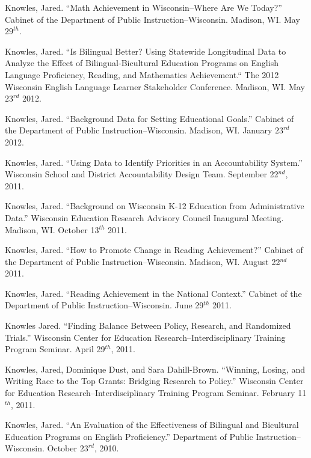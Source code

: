 \documentclass[margin,line]{res}
\begin{document}
\begin{resume}

Knowles, Jared. ``Math Achievement in Wisconsin--Where Are We Today?'' Cabinet of the Department of Public Instruction--Wisconsin. Madison, WI. May $29^{th}$. 

Knowles, Jared. ``Is Bilingual Better? Using Statewide Longitudinal Data to Analyze the Effect of Bilingual-Bicultural Education Programs on English Language Proficiency, Reading, and Mathematics Achievement.`` The 2012 Wisconsin English Language Learner Stakeholder Conference. Madison, WI. May $23^{rd}$ 2012. 

Knowles, Jared. ``Background Data for Setting Educational Goals.'' Cabinet of the Department of Public Instruction--Wisconsin. Madison, WI. January $23^{rd}$ 2012. 

Knowles, Jared. ``Using Data to Identify Priorities in an Accountability System.'' Wisconsin School and District Accountability Design Team. September 22$^{nd}$, 2011.

Knowles, Jared. ``Background on Wisconsin K-12 Education from Administrative Data.'' Wisconsin Education Research Advisory Council Inaugural Meeting. Madison, WI. October 13$^{th}$ 2011.

Knowles, Jared. ``How to Promote Change in Reading Achievement?'' Cabinet of the Department of Public Instruction--Wisconsin. Madison, WI. August 22$^{nd}$ 2011.

Knowles, Jared. ``Reading Achievement in the National Context.'' Cabinet of the Department of Public Instruction--Wisconsin. June 29$^{th}$ 2011.

Knowles Jared. ``Finding Balance Between Policy, Research, and Randomized Trials.'' Wisconsin Center for Education Research--Interdisciplinary Training Program Seminar. April 29$^{th}$, 2011.

Knowles, Jared, Dominique Dust, and Sara Dahill-Brown. ``Winning, Losing, and Writing Race to the Top Grants: Bridging Research to Policy.'' Wisconsin Center for Education Research--Interdisciplinary Training Program Seminar. February 11$^{th}$, 2011.

Knowles, Jared. ``An Evaluation of the Effectiveness of Bilingual and Bicultural Education Programs on English Proficiency.'' Department of Public Instruction--Wisconsin. October $23^{rd}$, 2010. 



\end{resume}
\end{document}
